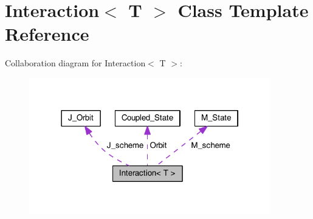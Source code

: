 \hypertarget{class_interaction}{\section{Interaction$<$ T $>$ Class Template Reference}
\label{class_interaction}
}


Collaboration diagram for Interaction$<$ T $>$\-:
\nopagebreak
\begin{figure}[H]
\begin{center}
\leavevmode
\includegraphics[width=297pt]{class_interaction__coll__graph}
\end{center}
\end{figure}
